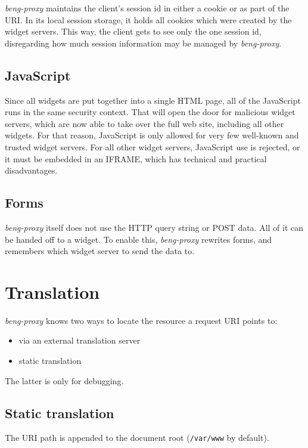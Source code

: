 \documentclass[a4paper,12pt]{article}
\begin{document}
\emph{beng-proxy} maintains the client's session id in either a cookie
or as part of the URI.  In its local session storage, it holds all
cookies which were created by the widget servers.  This way, the
client gets to see only the one session id, disregarding how much
session information may be managed by \emph{beng-proxy}.


\subsection{JavaScript}

Since all widgets are put together into a single HTML page, all of the
JavaScript runs in the same security context.  That will open the door
for malicious widget servers, which are now able to take over the full
web site, including all other widgets.  For that reason, JavaScript is
only allowed for very few well-known and trusted widget servers.  For
all other widget servers, JavaScript use is rejected, or it must be
embedded in an IFRAME, which has technical and practical
disadvantages.


\subsection{Forms}

\emph{beng-proxy} itself does not use the HTTP query string or POST
data.  All of it can be handed off to a widget.  To enable this,
\emph{beng-proxy} rewrites forms, and remembers which widget server to
send the data to.


\section{Translation}

\emph{beng-proxy} knows two ways to locate the resource a request URI
points to:

\begin{itemize}
\item via an external translation server
\item static translation
\end{itemize}

The latter is only for debugging.

\subsection{Static translation}

The URI path is appended to the document root (\texttt{/var/www} by
default).
\end{document}
